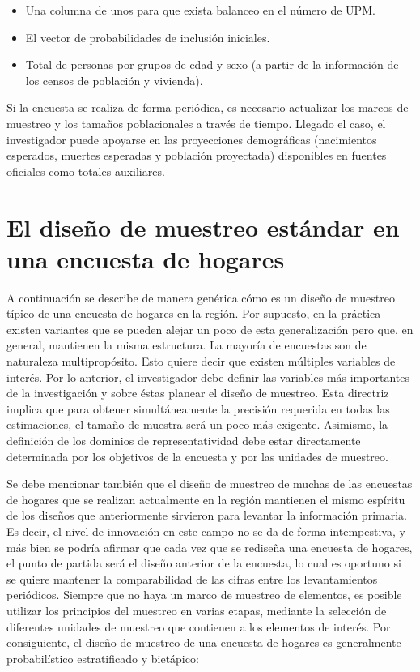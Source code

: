 \documentclass[
  12pt,
]{book}
\providecommand{\tightlist}{%
  \setlength{\itemsep}{0pt}\setlength{\parskip}{0pt}}
\begin{document}
\begin{itemize}
\tightlist
\item
  Una columna de unos para que exista balanceo en el número de UPM.
\item
  El vector de probabilidades de inclusión iniciales.
\item
  Total de personas por grupos de edad y sexo (a partir de la información de los censos de población y vivienda).
\end{itemize}

Si la encuesta se realiza de forma periódica, es necesario actualizar los marcos de muestreo y los tamaños poblacionales a través de tiempo. Llegado el caso, el investigador puede apoyarse en las proyecciones demográficas (nacimientos esperados, muertes esperadas y población proyectada) disponibles en fuentes oficiales como totales auxiliares.

\hypertarget{el-diseuxf1o-de-muestreo-estuxe1ndar-en-una-encuesta-de-hogares}{%
\section{El diseño de muestreo estándar en una encuesta de hogares}\label{el-diseuxf1o-de-muestreo-estuxe1ndar-en-una-encuesta-de-hogares}}

A continuación se describe de manera genérica cómo es un diseño de muestreo típico de una encuesta de hogares en la región. Por supuesto, en la práctica existen variantes que se pueden alejar un poco de esta generalización pero que, en general, mantienen la misma estructura. La mayoría de encuestas son de naturaleza multipropósito. Esto quiere decir que existen múltiples variables de interés. Por lo anterior, el investigador debe definir las variables más importantes de la investigación y sobre éstas planear el diseño de muestreo. Esta directriz implica que para obtener simultáneamente la precisión requerida en todas las estimaciones, el tamaño de muestra será un poco más exigente. Asimismo, la definición de los dominios de representatividad debe estar directamente determinada por los objetivos de la encuesta y por las unidades de muestreo.

Se debe mencionar también que el diseño de muestreo de muchas de las encuestas de hogares que se realizan actualmente en la región mantienen el mismo espíritu de los diseños que anteriormente sirvieron para levantar la información primaria. Es decir, el nivel de innovación en este campo no se da de forma intempestiva, y más bien se podría afirmar que cada vez que se rediseña una encuesta de hogares, el punto de partida será el diseño anterior de la encuesta, lo cual es oportuno si se quiere mantener la comparabilidad de las cifras entre los levantamientos periódicos. Siempre que no haya un marco de muestreo de elementos, es posible utilizar los principios del muestreo en varias etapas, mediante la selección de diferentes unidades de muestreo que contienen a los elementos de interés. Por consiguiente, el diseño de muestreo de una encuesta de hogares es generalmente probabilístico estratificado y bietápico:
\end{document}
